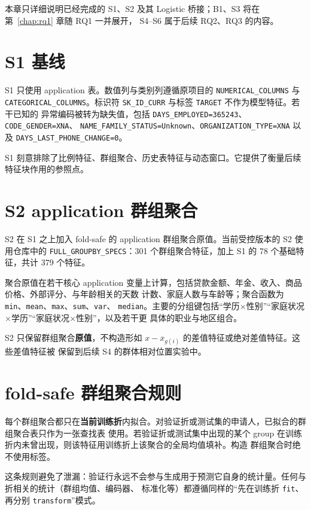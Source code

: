 \documentclass[11pt,UTF8,fontset=windows]{ctexrep}
\begin{document}
本章只详细说明已经完成的 S1、S2 及其 Logistic 桥接；B1、S3 将在第~\ref{chap:rq1} 章随 RQ1 一并展开，
S4--S6 属于后续 RQ2、RQ3 的内容。

\section{S1 基线}

S1 只使用 application 表。数值列与类别列遵循原项目的 \texttt{NUMERICAL\_COLUMNS} 与
\texttt{CATEGORICAL\_COLUMNS}。标识符 \texttt{SK\_ID\_CURR} 与标签 \texttt{TARGET} 不作为模型特征。若干已知的
异常编码被转为缺失值，包括 \texttt{DAYS\_EMPLOYED=365243}、\texttt{CODE\_GENDER=XNA}、
\texttt{NAME\_FAMILY\_STATUS=Unknown}、\texttt{ORGANIZATION\_TYPE=XNA} 以及
\texttt{DAYS\_LAST\_PHONE\_CHANGE=0}。

S1 刻意排除了比例特征、群组聚合、历史表特征与动态窗口。它提供了衡量后续特征块作用的参照点。

\section{S2 application 群组聚合}

S2 在 S1 之上加入 fold-safe 的 application 群组聚合原值。当前受控版本的 S2 使用仓库中的
\texttt{FULL\_GROUPBY\_SPECS}：301 个群组聚合特征，加上 S1 的 78 个基础特征，共计 379 个特征。

聚合原值在若干核心 application 变量上计算，包括贷款金额、年金、收入、商品价格、外部评分、与年龄相关的天数
计数、家庭人数与车龄等；聚合函数为 \texttt{min}、\texttt{mean}、\texttt{max}、\texttt{sum}、\texttt{var}、
\texttt{median}。主要的分组键包括“学历$\times$性别”“家庭状况$\times$学历”“家庭状况$\times$性别”，以及若干更
具体的职业与地区组合。

S2 只保留群组聚合\textbf{原值}，不构造形如 $x-\overline{x}_{g(i)}$ 的差值特征或绝对差值特征。这些差值特征被
保留到后续 S4 的群体相对位置实验中。

\section{fold-safe 群组聚合规则}

每个群组聚合都只在\textbf{当前训练折}内拟合。对验证折或测试集的申请人，已拟合的群组聚合表只作为一张查找表
使用。若验证折或测试集中出现的某个 group 在训练折内未曾出现，则该特征用训练折上该聚合的全局均值填补。构造
群组聚合时绝不使用标签。

这条规则避免了泄漏：验证行永远不会参与生成用于预测它自身的统计量。任何与折相关的统计（群组均值、编码器、
标准化等）都遵循同样的“先在训练折 \texttt{fit}、再分别 \texttt{transform}”模式。
\end{document}
